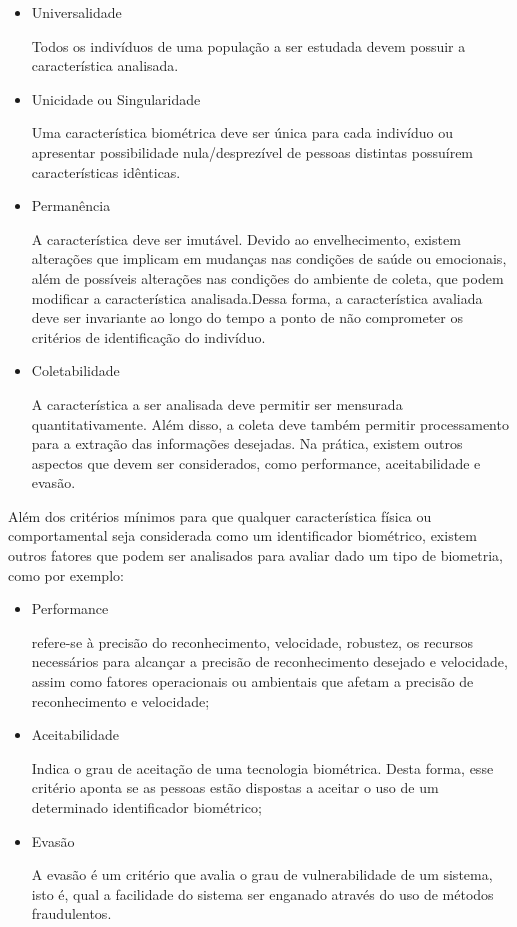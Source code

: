 \begin{itemize}
    
\item Universalidade

  Todos os indivíduos de uma população a ser estudada devem possuir a característica analisada.

\item Unicidade ou Singularidade

  Uma característica biométrica deve ser única para cada indivíduo ou apresentar possibilidade nula/desprezível de pessoas distintas possuírem características idênticas.

\item Permanência

  A característica deve ser imutável. Devido ao envelhecimento, existem alterações que implicam em mudanças nas condições de saúde ou emocionais, além de possíveis alterações nas condições do ambiente de coleta, que podem modificar a característica analisada.Dessa forma, a característica avaliada deve ser invariante ao longo do tempo a ponto de não comprometer os critérios de identificação do indivíduo.

\item Coletabilidade

  A característica a ser analisada deve permitir ser mensurada quantitativamente. Além disso, a coleta deve também permitir processamento para a extração das informações desejadas. Na prática, existem outros aspectos que devem ser considerados, como performance, aceitabilidade e evasão.

\end{itemize}

Além dos critérios mínimos para que qualquer característica física ou comportamental seja considerada como um identificador biométrico, existem outros fatores que podem ser analisados para avaliar dado um tipo de biometria, como por exemplo:


\begin{itemize}
    
    \item Performance
    
    refere-se à precisão do reconhecimento, velocidade, robustez, os recursos necessários para alcançar a precisão de reconhecimento desejado e velocidade, assim como fatores operacionais ou ambientais que afetam a precisão de reconhecimento e velocidade;


    \item Aceitabilidade
    
    Indica o grau de aceitação de uma tecnologia biométrica. Desta forma, esse critério aponta se as pessoas estão dispostas a aceitar o uso de um determinado identificador biométrico;
    
    \item Evasão
    
    A evasão é um critério que avalia o grau de vulnerabilidade de um sistema, isto é, qual a facilidade do sistema ser enganado através do uso de métodos fraudulentos.
    
\end{itemize}



